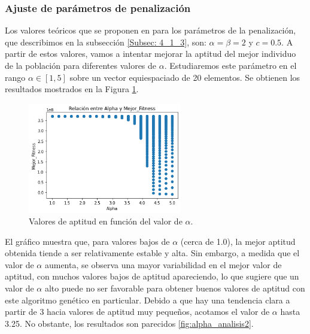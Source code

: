 \documentclass[12pt,a4paper]{book}
\begin{document}
\subsubsection{Ajuste de parámetros de penalización}
Los valores teóricos que se proponen en \cite{yu_introduction_2010} para los parámetros de la penalización, que describimos en la subsección \ref{Subsec: 4_1_3}, son: $\alpha = \beta = 2$ y $c = 0.5$. A partir de estos valores, vamos a intentar mejorar la aptitud del mejor individuo de la población para diferentes valores de $\alpha$. Estudiaremos este parámetro en el rango $\alpha \in [1, 5]$ sobre un vector equiespaciado de 20 elementos. Se obtienen los resultados mostrados en la Figura \ref{fig:alpha_analisis1}.

\begin{figure}[h] 
    	\begin{center}
    	\includegraphics[width=0.6\textwidth]{img/alpha_anl1.png}
    	\end{center}
    	\caption{Valores de aptitud en función del valor de $\alpha$.}
    	\label{fig:alpha_analisis1}
	\end{figure}
 
El gráfico muestra que, para valores bajos de $\alpha$ (cerca de 1.0), la mejor aptitud obtenida tiende a ser relativamente estable y alta. Sin embargo, a medida que el valor de $\alpha$ aumenta, se observa una mayor variabilidad en el mejor valor de aptitud, con muchos valores bajos de aptitud apareciendo, lo que sugiere que un valor de $\alpha$ alto puede no ser favorable para obtener buenos valores de aptitud con este algoritmo genético en particular. Debido a que hay una tendencia clara a partir de 3 hacia valores de aptitud muy pequeños, acotamos el  valor de $\alpha$ hasta 3.25. No obstante, los resultados son parecidos \ref{fig:alpha_analisis2}.
\end{document}
